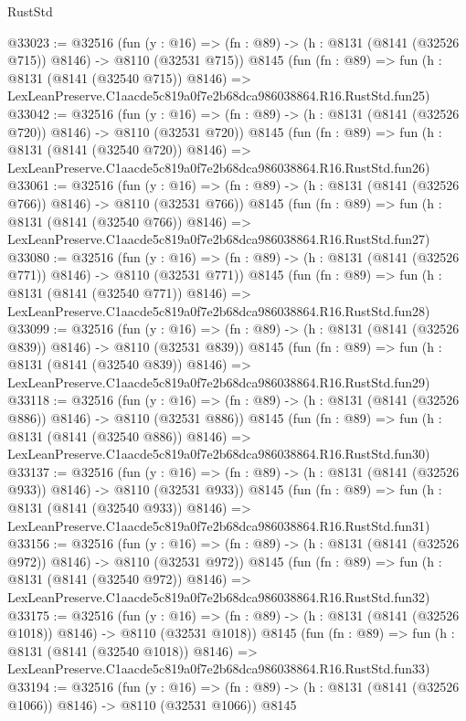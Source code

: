 \begin{lexlean}{RustStd}
\begin{coremodule}
@33023 := @32516
    (fun (y : @16) => (fn : @89) -> (h : @8131 (@8141 (@32526 @715)) @8146) -> @8110 (@32531 @715))
    @8145
    (fun (fn : @89) =>
    fun (h : @8131 (@8141 (@32540 @715)) @8146) =>
    LexLeanPreserve.C1aacde5c819a0f7e2b68dca986038864.R16.RustStd.fun25)
@33042 := @32516
    (fun (y : @16) => (fn : @89) -> (h : @8131 (@8141 (@32526 @720)) @8146) -> @8110 (@32531 @720))
    @8145
    (fun (fn : @89) =>
    fun (h : @8131 (@8141 (@32540 @720)) @8146) =>
    LexLeanPreserve.C1aacde5c819a0f7e2b68dca986038864.R16.RustStd.fun26)
@33061 := @32516
    (fun (y : @16) => (fn : @89) -> (h : @8131 (@8141 (@32526 @766)) @8146) -> @8110 (@32531 @766))
    @8145
    (fun (fn : @89) =>
    fun (h : @8131 (@8141 (@32540 @766)) @8146) =>
    LexLeanPreserve.C1aacde5c819a0f7e2b68dca986038864.R16.RustStd.fun27)
@33080 := @32516
    (fun (y : @16) => (fn : @89) -> (h : @8131 (@8141 (@32526 @771)) @8146) -> @8110 (@32531 @771))
    @8145
    (fun (fn : @89) =>
    fun (h : @8131 (@8141 (@32540 @771)) @8146) =>
    LexLeanPreserve.C1aacde5c819a0f7e2b68dca986038864.R16.RustStd.fun28)
@33099 := @32516
    (fun (y : @16) => (fn : @89) -> (h : @8131 (@8141 (@32526 @839)) @8146) -> @8110 (@32531 @839))
    @8145
    (fun (fn : @89) =>
    fun (h : @8131 (@8141 (@32540 @839)) @8146) =>
    LexLeanPreserve.C1aacde5c819a0f7e2b68dca986038864.R16.RustStd.fun29)
@33118 := @32516
    (fun (y : @16) => (fn : @89) -> (h : @8131 (@8141 (@32526 @886)) @8146) -> @8110 (@32531 @886))
    @8145
    (fun (fn : @89) =>
    fun (h : @8131 (@8141 (@32540 @886)) @8146) =>
    LexLeanPreserve.C1aacde5c819a0f7e2b68dca986038864.R16.RustStd.fun30)
@33137 := @32516
    (fun (y : @16) => (fn : @89) -> (h : @8131 (@8141 (@32526 @933)) @8146) -> @8110 (@32531 @933))
    @8145
    (fun (fn : @89) =>
    fun (h : @8131 (@8141 (@32540 @933)) @8146) =>
    LexLeanPreserve.C1aacde5c819a0f7e2b68dca986038864.R16.RustStd.fun31)
@33156 := @32516
    (fun (y : @16) => (fn : @89) -> (h : @8131 (@8141 (@32526 @972)) @8146) -> @8110 (@32531 @972))
    @8145
    (fun (fn : @89) =>
    fun (h : @8131 (@8141 (@32540 @972)) @8146) =>
    LexLeanPreserve.C1aacde5c819a0f7e2b68dca986038864.R16.RustStd.fun32)
@33175 := @32516
    (fun (y : @16) =>
    (fn : @89) -> (h : @8131 (@8141 (@32526 @1018)) @8146) -> @8110 (@32531 @1018))
    @8145
    (fun (fn : @89) =>
    fun (h : @8131 (@8141 (@32540 @1018)) @8146) =>
    LexLeanPreserve.C1aacde5c819a0f7e2b68dca986038864.R16.RustStd.fun33)
@33194 := @32516
    (fun (y : @16) =>
    (fn : @89) -> (h : @8131 (@8141 (@32526 @1066)) @8146) -> @8110 (@32531 @1066))
    @8145

\end{coremodule}
\end{lexlean}
